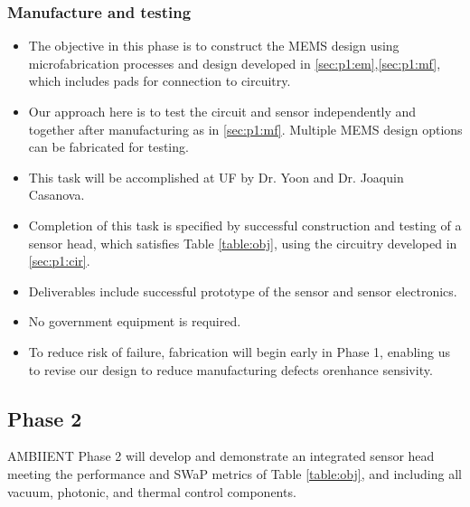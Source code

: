 \subsubsection{Manufacture and testing}
\begin{itemize}
\item The objective in this phase is to construct the MEMS design using microfabrication processes and design developed in \ref{sec:p1:em},\ref{sec:p1:mf}, which includes pads for connection to circuitry.
\item Our approach here is to test the circuit and sensor independently and together after manufacturing as in \ref{sec:p1:mf}. Multiple MEMS design options can be fabricated for testing.
\item This task will be accomplished at UF by Dr. Yoon and Dr. Joaquin Casanova.
\item Completion of this task is specified by successful construction and testing of a sensor head, which satisfies Table \ref{table:obj}, using the circuitry developed in \ref{sec:p1:cir}.
\item Deliverables include successful prototype of the sensor and sensor electronics.
\item No government equipment is required.
\item To reduce risk of failure, fabrication will begin early in Phase 1, enabling us to revise our design to reduce manufacturing defects orenhance sensivity. 
\end{itemize}

\subsection{Phase 2}
  
AMBIIENT Phase 2 will develop and demonstrate an integrated sensor head meeting the
performance and SWaP metrics of Table \ref{table:obj}, and including all vacuum, photonic, and thermal
control components.

